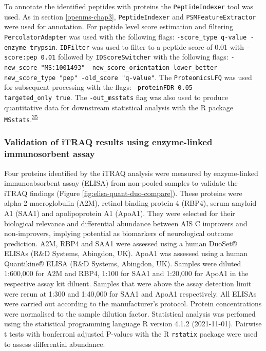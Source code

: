 \documentclass[
]{article}
\begin{document}
To annotate the identified peptides with proteins the \texttt{PeptideIndexer} tool was used.
As in section \ref{openms-chap3}, \texttt{PeptideIndexer} and \texttt{PSMFeatureExtractor} were used for annotation.
For peptide level score estimation and filtering \texttt{PercolatorAdapter} was used with the following flags: \texttt{-score\_type\ q-value\ -enzyme\ trypsin}.
\texttt{IDFilter} was used to filter to a peptide score of 0.01 with \texttt{-score:pep\ 0.01} followed by \texttt{IDScoreSwitcher} with the following flags: \texttt{-new\_score\ "MS:1001493"\ -new\_score\_orientation\ lower\_better\ -new\_score\_type\ "pep"\ -old\_score\ "q-value"}.
The \texttt{ProteomicsLFQ} was used for subsequent processing with the flags: \texttt{-proteinFDR\ 0.05\ -targeted\_only\ true}.
The \texttt{-out\_msstats} flag was also used to produce quantitative data for downstream statistical analysis with the R package \texttt{MSstats}.\textsuperscript{\protect\hyperlink{ref-choi_msstats_2014}{35}}

\clearpage

\hypertarget{validation-of-itraq-results-using-enzyme-linked-immunosorbent-assay}{%
\subsubsection{Validation of iTRAQ results using enzyme-linked immunosorbent assay}\label{validation-of-itraq-results-using-enzyme-linked-immunosorbent-assay}}

Four proteins identified by the iTRAQ analysis were measured by enzyme-linked immunoabsorbent assay (ELISA) from non-pooled samples to validate the iTRAQ findings (Figure \ref{fig:elisa-quant-duo-compare}).
These proteins were alpha-2-macroglobulin (A2M), retinol binding protein 4 (RBP4), serum amyloid A1 (SAA1) and apolipoprotein A1 (ApoA1).
They were selected for their biological relevance and differential abundance between AIS C improvers and non-improvers, implying potential as biomarkers of neurological outcome prediction.
A2M, RBP4 and SAA1 were assessed using a human DuoSet® ELISAs (R\&D Systems, Abingdon, UK).
ApoA1 was assessed using a human Quantikine® ELISA (R\&D Systems, Abingdon, UK).
Samples were diluted 1:600,000 for A2M and RBP4, 1:100 for SAA1 and 1:20,000 for ApoA1 in the respective assay kit diluent.
Samples that were above the assay detection limit were rerun at 1:300 and 1:40,000 for SAA1 and ApoA1 respectively.
All ELISAs were carried out according to the manufacturer's protocol.
Protein concentrations were normalised to the sample dilution factor.
Statistical analysis was perfomed using the statistical programming language R version 4.1.2 (2021-11-01).
Pairwise t tests with bonferroni adjusted P-values with the R \texttt{rstatix} package were used to assess differential abundance.
\end{document}
